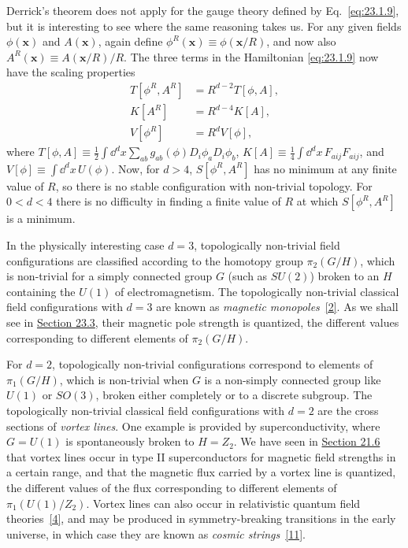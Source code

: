 Derrick's theorem does not apply for the gauge theory defined by
Eq.~\eqref{eq:23.1.9}, but it is interesting to see where the same reasoning
takes us. For any given fields $\phi(\mathbf{x})$ and $A(\mathbf{x})$,
again define $\phi^R(\mathbf{x})\equiv\phi(\mathbf{x}/R)$, and now also
$A^R(\mathbf{x})\equiv A(\mathbf{x}/R)/R$. The three terms in the
Hamiltonian \eqref{eq:23.1.9} now have the scaling properties
\[
 \begin{split}
  T[\phi^R,A^R]&=R^{d-2}T[\phi,A],\\
  K[A^R]&=R^{d-4}K[A],\\
  V[\phi^R]&=R^dV[\phi],
 \end{split}
\]
where
$T[\phi,A]\equiv\frac{1}{2}\int \dd^d x
\sum_{ab}g_{ab}(\phi)D_i\phi_aD_i\phi_b$,\newline
$K[A]\equiv\frac{1}{4}\int \dd^d x\,F_{a ij}F_{a ij}$, and
$V[\phi]\equiv\int \dd^d x\,U(\phi)$. Now, for $d>4$,
$S[\phi^R,A^R]$ has no minimum at any finite value of $R$, so there is no
stable configuration with non-trivial topology. For $0<d<4$ there is no
difficulty in finding a finite value of $R$ at which $S[\phi^R,A^R]$ is a
minimum.

In the physically interesting case $d=3$, topologically non-trivial field
configurations are classified according to the homotopy group
$\pi_2(G/H)$, which is non-trivial for a simply connected group $G$ (such
as $SU(2)$) broken to an $H$ containing the $U(1)$ of electromagnetism. The
topologically non-trivial classical field configurations with $d=3$ are
known as \emph{magnetic monopoles}~\hyperref[ch23-ref-2]{[2]}. As we shall
see in \hyperref[sec:23.3]{Section 23.3}, their magnetic pole strength is
quantized, the different values corresponding to different elements of
$\pi_2(G/H)$.

For $d=2$, topologically non-trivial configurations correspond to elements
of $\pi_1(G/H)$, which is non-trivial when $G$ is a non-simply connected
group like $U(1)$ or $SO(3)$, broken either completely or to a discrete
subgroup. The topologically non-trivial classical field configurations with
$d=2$ are the cross sections of \emph{vortex lines}. One example is
provided by superconductivity, where $G=U(1)$ is spontaneously broken to
$H=Z_2$. We have seen in \hyperref[sec:21.6]{Section 21.6} that vortex
lines occur in type II superconductors for magnetic field strengths in a
certain range, and that the magnetic flux carried by a vortex line is
quantized, the different values of the flux corresponding to different
elements of $\pi_1(U(1)/Z_2)$. Vortex lines can also occur in relativistic
quantum field theories~\hyperref[ch23-ref-4]{[4]}, and may be produced in
symmetry-breaking transitions in the early universe, in which case they are
known as \emph{cosmic strings}~\hyperref[ch23-ref-11]{[11]}.

